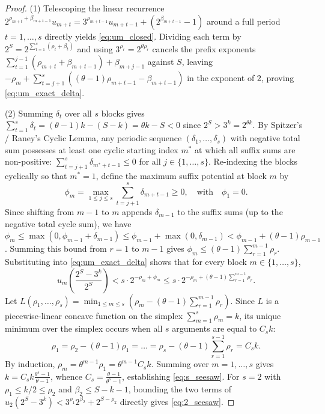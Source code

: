 \documentclass[11pt, a4paper]{amsart}
\theoremstyle{definition}
\begin{document}
\begin{proof}
(1) Telescoping the linear recurrence $2^{\rho_{m+t} + \beta_{m+t-1}} u_{m+t} = 3^{\rho_{m+t-1}} u_{m+t-1} + (2^{\beta_{m+t-1}} - 1)$ around a full period $t = 1, \dots, s$ directly yields \eqref{eq:um_closed}. Dividing each term by $2^S = 2^{\sum_{t=1}^s(\rho_t + \beta_t)}$ and using $3^{\rho_r} = 2^{\theta \rho_r}$ cancels the prefix exponents $\sum_{t=1}^{j-1}(\rho_{m+t} + \beta_{m+t-1}) + \beta_{m+j-1}$ against $S$, leaving $-\rho_m + \sum_{t=j+1}^s ((\theta - 1)\rho_{m+t-1} - \beta_{m+t-1})$ in the exponent of $2$, proving \eqref{eq:um_exact_delta}.

(2) Summing $\delta_t$ over all $s$ blocks gives $\sum_{t=1}^s \delta_t = (\theta - 1)k - (S - k) = \theta k - S < 0$ since $2^S > 3^k = 2^{\theta k}$. By Spitzer's / Raney's Cyclic Lemma, any periodic sequence $(\delta_1, \dots, \delta_s)$ with negative total sum possesses at least one cyclic starting index $m^*$ at which all suffix sums are non-positive: $\sum_{t=j+1}^s \delta_{m^*+t-1} \le 0$ for all $j \in \{1, \dots, s\}$. Re-indexing the blocks cyclically so that $m^* = 1$, define the maximum suffix potential at block $m$ by
\[
\phi_m = \max_{1 \le j \le s} \sum_{t=j+1}^s \delta_{m+t-1} \ge 0, \quad \text{with} \quad \phi_1 = 0.
\]
Since shifting from $m-1$ to $m$ appends $\delta_{m-1}$ to the suffix sums (up to the negative total cycle sum), we have $\phi_m \le \max(0, \phi_{m-1} + \delta_{m-1}) \le \phi_{m-1} + \max(0, \delta_{m-1}) < \phi_{m-1} + (\theta - 1)\rho_{m-1}$. Summing this bound from $r = 1$ to $m - 1$ gives $\phi_m \le (\theta - 1)\sum_{r=1}^{m-1} \rho_r$. Substituting into \eqref{eq:um_exact_delta} shows that for every block $m \in \{1, \dots, s\}$,
\begin{equation}\label{eq:triangular_bound}
u_m \left(\frac{2^S - 3^k}{2^S}\right) < s \cdot 2^{-\rho_m + \phi_m} \le s \cdot 2^{-\rho_m + (\theta - 1)\sum_{r=1}^{m-1} \rho_r}.
\end{equation}
Let $L(\rho_1, \dots, \rho_s) = \min_{1 \le m \le s} \left( \rho_m - (\theta - 1)\sum_{r=1}^{m-1} \rho_r \right)$. Since $L$ is a piecewise-linear concave function on the simplex $\sum_{m=1}^s \rho_m = k$, its unique minimum over the simplex occurs when all $s$ arguments are equal to $C_s k$:
\[
\rho_1 = \rho_2 - (\theta - 1)\rho_1 = \dots = \rho_s - (\theta - 1)\sum_{r=1}^{s-1} \rho_r = C_s k.
\]
By induction, $\rho_m = \theta^{m-1} \rho_1 = \theta^{m-1} C_s k$. Summing over $m = 1, \dots, s$ gives $k = C_s k \frac{\theta^s - 1}{\theta - 1}$, whence $C_s = \frac{\theta - 1}{\theta^s - 1}$, establishing \eqref{eq:s_seesaw}. For $s = 2$ with $\rho_1 \le k/2 \le \rho_2$ and $\beta_2 \le S - k - 1$, bounding the two terms of $u_2(2^S - 3^k) < 3^{\rho_1} 2^{\beta_2} + 2^{S - \rho_2}$ directly gives \eqref{eq:2_seesaw}.
\end{proof}
\end{document}

